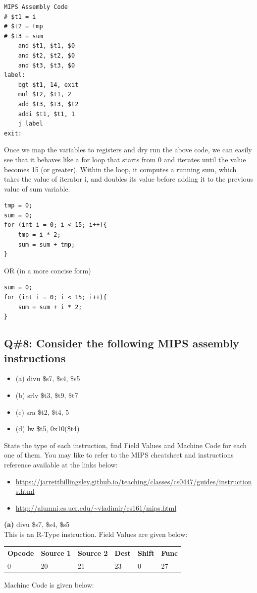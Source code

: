 \begin{lstlisting}
MIPS Assembly Code
# $t1 = i
# $t2 = tmp
# $t3 = sum
    and $t1, $t1, $0
    and $t2, $t2, $0
    and $t3, $t3, $0
label:
    bgt $t1, 14, exit
    mul $t2, $t1, 2
    add $t3, $t3, $t2
    addi $t1, $t1, 1
    j label
exit:
\end{lstlisting}
Once we map the variables to registers and dry run the above code, we can easily see that it
behaves like a for loop that starts from 0 and iterates until the value becomes 15 (or greater).
Within the loop, it computes a running sum, which takes the value of iterator i, and doubles its
value before adding it to the previous value of sum variable.
\begin{lstlisting}
tmp = 0;
sum = 0;
for (int i = 0; i < 15; i++){
    tmp = i * 2;
    sum = sum + tmp;
}
\end{lstlisting}
OR (in a more concise form)
\begin{lstlisting}
sum = 0;
for (int i = 0; i < 15; i++){
    sum = sum + i * 2;
}
\end{lstlisting}

\subsection*{Q\#8: Consider the following MIPS assembly instructions}
\begin{itemize}
  \item{(a)} divu \$s7, \$s4, \$s5
  \item{(b)} srlv \$t3, \$t9, \$t7
  \item{(c)} sra \$t2, \$t4, 5
  \item{(d)} lw \$t5, 0x10(\$t4)
\end{itemize}
State the type of each instruction, find Field Values and Machine Code for each one of them.
You may like to refer to the MIPS cheatsheet and instructions reference available at the links below:
\begin{itemize}
    \item \url{https://jarrettbillingsley.github.io/teaching/classes/cs0447/guides/instructions.html}
    \item \url{http://alumni.cs.ucr.edu/~vladimir/cs161/mips.html}
\end{itemize}
\textbf{(a)} divu \$s7, \$s4, \$s5 \\
This is an R-Type instruction. Field Values are given below:\\
\begin{tabularx}{\textwidth}{|X|X|X|X|X|X|}
\hline 
Opcode & Source 1 & Source 2 & Dest & Shift & Func \\
\hline
0 & 20 & 21 & 23&0&27 \\
\hline
\end{tabularx}
Machine Code is given below:

